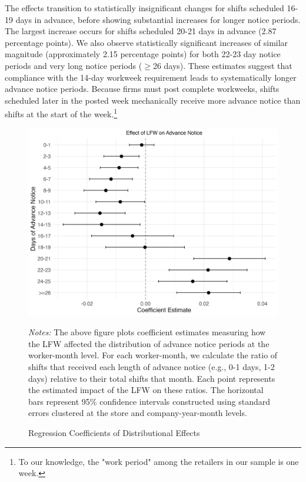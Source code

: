 \documentclass[letterpaper,11pt,leqno]{article}
\theoremstyle{paper}
\newcommand{\note}[2][]{\parbox{\textwidth}{\footnotesize\vspace*{10pt}\textit{#1}#2}}
\begin{document}
The effects transition to statistically insignificant changes for shifts scheduled 16-19 days in advance, before showing substantial increases for longer notice periods. The largest increase occurs for shifts scheduled 20-21 days in advance (2.87 percentage points). We also observe statistically significant increases of similar magnitude (approximately 2.15 percentage points) for both 22-23 day notice periods and very long notice periods ($\geq$26 days). These estimates suggest that compliance with the 14-day workweek requirement leads to systematically longer advance notice periods. Because firms must post complete workweeks, shifts scheduled later in the posted week mechanically receive more advance notice than shifts at the start of the week.\footnote{To our knowledge, the "work period" among the retailers in our sample is one week.}



\begin{figure}[h]
\centering
\caption{Regression Coefficients of Distributional Effects}
\includegraphics[scale=0.16]{Figures_Revision_2/advance_notice_distr_plot_new.jpeg}
\vspace{-0.50cm}
\note{\scriptsize \singlespacing \textit{Notes: } The above figure plots coefficient estimates measuring how the LFW affected the distribution of advance notice periods at the worker-month level. For each worker-month, we calculate the ratio of shifts that received each length of advance notice (e.g., 0-1 days, 1-2 days) relative to their total shifts that month. Each point represents the estimated impact of the LFW on these ratios. The horizontal bars represent 95\% confidence intervals constructed using standard errors clustered at the store and company-year-month levels. }
\label{f:adv_notice_distribution}
\end{figure}
\end{document}
